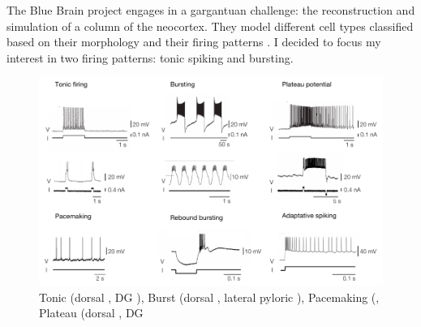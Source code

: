 The Blue Brain project engages in a gargantuan challenge: the reconstruction and simulation of a column of the neocortex. They model different cell types classified based on their morphology and their firing patterns  \citep{markram_reconstruction_2015}.  I decided to focus my interest in two firing patterns: tonic spiking and bursting. 


\begin{figure}[h!]
    \centering
    \includegraphics{latex/fig/Intro/Bgd_FiringPattern.pdf}
    \caption{Tonic (dorsal \citep{marder_plateau_2003}, DG \citep{weimann_effects_1993}), Burst (dorsal \citep{marder_plateau_2003}, lateral pyloric \citep{marder_from_2021}),  Pacemaking (\citep{ramirez_role_2011}, Plateau (dorsal \citep{marder_plateau_2003}, DG \citep{weimann_effects_1993}  }
    \label{fig:my_label}
\end{figure}

